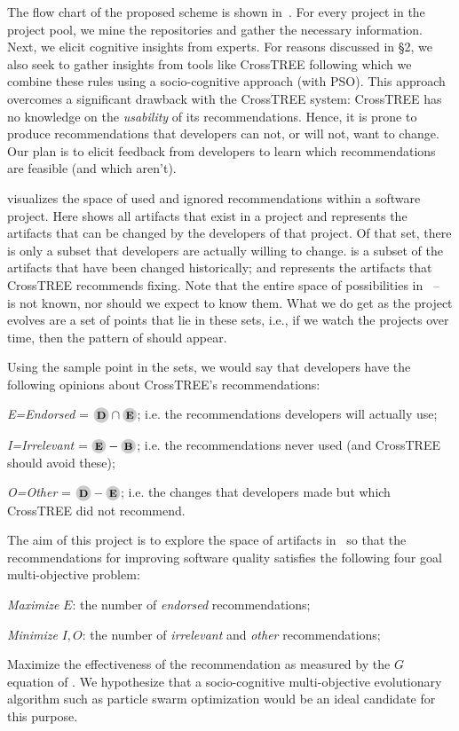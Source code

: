 The flow chart of the proposed scheme is shown in~. For every project in the project pool, we mine the repositories and gather the necessary information. Next, we elicit cognitive insights from experts. For reasons discussed in \S2, we also seek to gather insights from tools like CrossTREE following which we combine these rules using a socio-cognitive approach (with PSO).  This approach overcomes a significant drawback with the  CrossTREE system:  CrossTREE has no knowledge on the {\em usability} of its recommendations. Hence, it is prone to produce recommendations that developers can not, or will not, want to change. Our plan is to elicit
feedback from developers to learn which recommendations are feasible (and which aren't).

 visualizes the space of used and ignored recommendations within a software project.
Here  shows  all   artifacts that exist in a project and  represents the artifacts that can be changed by the developers
of that project. 
Of that set, there is only a subset  that developers are actually willing to change.
  is  a subset of the artifacts  that have been changed historically; and
 represents the artifacts that CrossTREE recommends fixing. Note that the entire space of possibilities in ~--~ is not known, nor should we expect to know them. What we do get as the project evolves are a set of points that lie in these sets, i.e., if we watch the projects over time, then the pattern of  should appear. 

 

Using the sample point in the sets, we would say that developers have the following opinions about CrossTREE's recommendations:
\bi
\item {\em E=Endorsed} = $\circled{D} \cap \circled{E}$; i.e. the    recommendations   developers will actually use; 
\item {\em I=Irrelevant} =  $\circled{E} - \circled{B}$; i.e.  the recommendations  never used (and CrossTREE should avoid these);
\item {\em O=Other} = $\circled{D}- \circled{E}$; i.e. the  changes that developers made but which CrossTREE did not recommend.
\ei

The aim of this project is to explore the space of artifacts in~ so that the recommendations for improving software quality satisfies the following four goal multi-objective problem:
\bi
\item[1.]  {\em Maximize} $E$: the number of   {\em endorsed} recommendations;
\item[2,3.]  {\em Minimize} $I,O$: the  number of {\em irrelevant} and {\em other} recommendations;
\item[4.]  Maximize the  effectiveness of the recommendation as measured by the   $G$ equation of  .
\ei
\noindent We hypothesize that a socio-cognitive multi-objective evolutionary algorithm such as particle swarm optimization would be an ideal candidate for this purpose.

